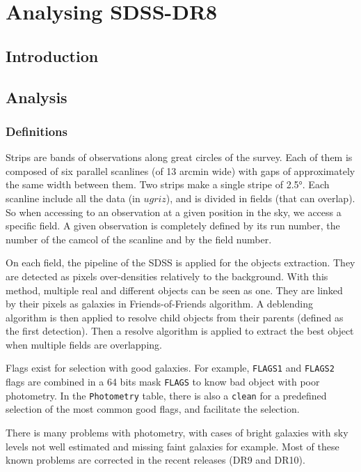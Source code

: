 \chapter{Analysing SDSS-DR8}
\label{cha:sdss}
\minitoc%

\section{Introduction}


\section{Analysis}

\subsection{Definitions}

Strips are bands of observations along great circles of the survey. Each of
them is composed of six parallel scanlines (of 13 arcmin wide) with gaps of
approximately the same width between them. Two strips make a single stripe
of 2.5°. Each scanline include all the data (in $ugriz$), and is divided in
fields (that can overlap). So when accessing to an observation at a given
position in the sky, we access a specific field. A given observation is
completely defined by its run number, the number of the camcol of the
scanline and by the field number.

On each field, the pipeline of the SDSS is applied for the objects
extraction. They are detected as pixels over-densities relatively to the
background. With this method, multiple real and different objects can be
seen as one. They are linked by their pixels as galaxies in
Friends-of-Friends algorithm. A deblending algorithm is then applied to
resolve child objects from their parents (defined as the first detection).
Then a resolve algorithm is applied to extract the best object when multiple
fields are overlapping.

Flags exist for selection with good galaxies. For example, \texttt{FLAGS1}
and \texttt{FLAGS2} flags are combined in a 64 bits mask \texttt{FLAGS} to
know bad object with poor photometry. In the \texttt{Photometry} table,
there is also a \texttt{clean} for a predefined selection of the most common
good flags, and facilitate the selection.

There is many problems with photometry, with cases of bright galaxies with
sky levels not well estimated and missing faint galaxies for example. Most
of these known problems are corrected in the recent releases (DR9 and DR10).

